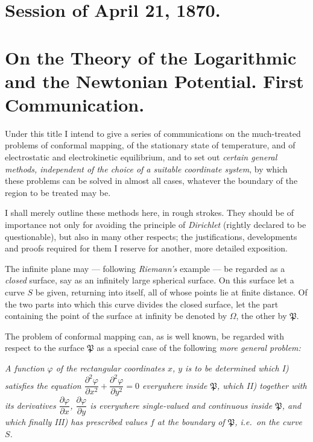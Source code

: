 \documentclass{article}
\begin{document}

\section*{Session of April 21, 1870.}

\section*{On the Theory of the Logarithmic and the Newtonian Potential. First Communication.}

Under this title I intend to give a series of communications on the much-treated problems of conformal mapping, of the stationary state of temperature, and of electrostatic and electrokinetic equilibrium, and to set out \emph{certain general methods, independent of the choice of a suitable coordinate system}, by which these problems can be solved in almost all cases, whatever the boundary of the region to be treated may be.

I shall merely outline these methods here, in rough strokes. They should be of importance not only for avoiding the principle of \emph{Dirichlet} (rightly declared to be questionable), but also in many other respects; the justifications, developments and proofs required for them I reserve for another, more detailed exposition.

The infinite plane may --- following \emph{Riemann's} example --- be regarded as a \emph{closed} surface, say as an infinitely large spherical surface. On this surface let a curve $S$ be given, returning into itself, all of whose points lie at finite distance. Of the two parts into which this curve divides the closed surface, let the part containing the point of the surface at infinity be denoted by $\Omega$, the other by $\mathfrak{P}$.

The problem of conformal mapping can, as is well known,
be regarded with respect to the surface $\mathfrak{P}$ as a special case of the following \emph{more general problem:}

\emph{A function $\varphi$ of the rectangular coordinates $x$, $y$ is to be determined which I) satisfies the equation $\dfrac{\partial^{2}\varphi}{\partial x^{2}}+\dfrac{\partial^{2}\varphi}{\partial y^{2}}=0$ everywhere inside $\mathfrak{P}$, which II) together with its derivatives $\dfrac{\partial\varphi}{\partial x}$, $\dfrac{\partial\varphi}{\partial y}$ is everywhere single-valued and continuous inside $\mathfrak{P}$, and which finally III) has prescribed values $f$ at the boundary of $\mathfrak{P}$, i.e.\ on the curve $S$.}
\end{document}
